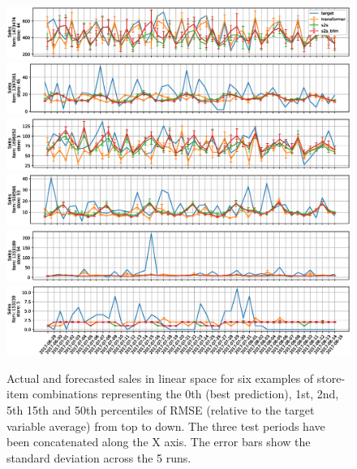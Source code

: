 \documentclass{elsarticle}
\begin{document}
	\begin{figure}
	\centering
	\includegraphics[width=1\linewidth]{img/sample_0_lin}
	\includegraphics[width=1\linewidth]{img/sample_1_lin}
	\includegraphics[width=1\linewidth]{img/sample_2_lin}
	\includegraphics[width=1\linewidth]{img/sample_3_lin}
	\includegraphics[width=1\linewidth]{img/sample_4_lin}
	\includegraphics[width=1\linewidth]{img/sample_5_lin}
	\caption{Actual and forecasted sales in linear space for six examples of store-item combinations representing the 0th (best prediction), 1st, 2nd, 5th 15th and 50th percentiles of RMSE (relative to the target variable average) from top to down. The three test periods have been concatenated along the X axis. The error bars show the standard deviation across the 5 runs.}
	\label{fig:ts_lin}
\end{figure}
	
\end{document}

